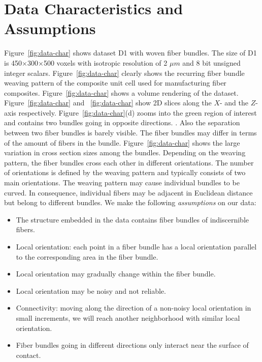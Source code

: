 \section {Data Characteristics and Assumptions}
\label{sec:char_data}
Figure~\ref{fig:data-char} shows dataset D1 with woven fiber bundles. The size of D1 is 450$\times$300$\times$500 voxels with isotropic resolution of 2 $\mu m$ and 8 bit unsigned integer scalars. Figure~\ref{fig:data-char} clearly shows the recurring fiber bundle weaving pattern of the composite unit cell used for manufacturing fiber composites. Figure~\ref{fig:data-char} shows a volume rendering of the dataset. Figure~\ref{fig:data-char} and ~\ref{fig:data-char} show 2D slices along the $X$- and the $Z$-axis respectively. Figure~\ref{fig:data-char}(d) zooms into the green region of interest and contains two bundles going in opposite directions. . Also the separation between two fiber bundles is barely visible. The fiber bundles may differ in terms of the amount of fibers in the bundle. Figure~\ref{fig:data-char} shows the large variation in cross section sizes among the bundles.
Depending on the weaving pattern, the fiber bundles cross each other in different orientations. The number of orientations is defined by the weaving pattern and typically consists of two main orientations. The weaving pattern may cause individual bundles to be curved. In consequence, individual fibers may be adjacent in Euclidean distance but belong to different bundles. 
We make the following \textit{assumptions} on our data:

\begin{itemize}[noitemsep]
\item The structure embedded in the data contains fiber bundles of indiscernible fibers.
\item Local orientation: each point in a fiber bundle has a local orientation parallel to the corresponding area in the fiber bundle.
\item Local orientation may gradually change within the fiber bundle.
\item Local orientation may be noisy and not reliable.
\item Connectivity: moving along the direction of a non-noisy local orientation in small increments, we will reach another neighborhood with similar local orientation.
\item Fiber bundles going in different directions only interact near the surface of contact.
\end{itemize}